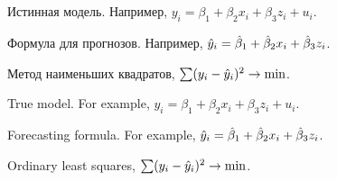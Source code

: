 
\maketitle


\newpage

\tableofcontents{}




\newpage
\section{ }

\begin{translationru}
\begin{leftbar}
Истинная модель. Например, $y_i = \beta_1 + \beta_2 x_i + \beta_3 z_i + u_i$.

Формула для прогнозов. Например, $\hat{y}_i = \hat{\beta}_1 + \hat{\beta}_2 x_i + \hat{\beta}_3 z_i$.

Метод наименьших квадратов, $\sum (y_i - \hat{y}_i)^2 \to \min$.  
\end{leftbar}  
\end{translationru}

\begin{translationen}
\begin{leftbar}
True model. For example, $y_i = \beta_1 + \beta_2 x_i + \beta_3 z_i + u_i$.

Forecasting formula. For example, $\hat{y}_i = \hat{\beta}_1 + \hat{\beta}_2 x_i + \hat{\beta}_3 z_i$.

Ordinary least squares, $\sum (y_i - \hat{y}_i)^2 \to \min$.  
\end{leftbar}  
\end{translationen}
  


